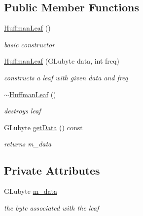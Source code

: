\subsection*{Public Member Functions}
\begin{DoxyCompactItemize}
\item 
\mbox{\label{classnta_1_1HuffmanLeaf_afcd113b293d90d3297d409421bbfb285}} 
\hyperlink{classnta_1_1HuffmanLeaf_afcd113b293d90d3297d409421bbfb285}{Huffman\+Leaf} ()
\begin{DoxyCompactList}\small\item\em basic constructor \end{DoxyCompactList}\item 
\mbox{\label{classnta_1_1HuffmanLeaf_a68e98537fe635d83cc04a2ce70e99993}} 
\hyperlink{classnta_1_1HuffmanLeaf_a68e98537fe635d83cc04a2ce70e99993}{Huffman\+Leaf} (G\+Lubyte data, int freq)
\begin{DoxyCompactList}\small\item\em constructs a leaf with given data and freq \end{DoxyCompactList}\item 
\mbox{\label{classnta_1_1HuffmanLeaf_a579b5b814ae18f2230a07c186f96890f}} 
\hyperlink{classnta_1_1HuffmanLeaf_a579b5b814ae18f2230a07c186f96890f}{$\sim$\+Huffman\+Leaf} ()
\begin{DoxyCompactList}\small\item\em destroys leaf \end{DoxyCompactList}\item 
\mbox{\label{classnta_1_1HuffmanLeaf_aebdea9a65041b1bca7dc89a32a44d0f3}} 
G\+Lubyte \hyperlink{classnta_1_1HuffmanLeaf_aebdea9a65041b1bca7dc89a32a44d0f3}{get\+Data} () const
\begin{DoxyCompactList}\small\item\em returns m\+\_\+data \end{DoxyCompactList}\end{DoxyCompactItemize}
\subsection*{Private Attributes}
\begin{DoxyCompactItemize}
\item 
\mbox{\label{classnta_1_1HuffmanLeaf_a1a02d12c1ee80e4d3686fb05a0d140b0}} 
G\+Lubyte \hyperlink{classnta_1_1HuffmanLeaf_a1a02d12c1ee80e4d3686fb05a0d140b0}{m\+\_\+data}
\begin{DoxyCompactList}\small\item\em the byte associated with the leaf \end{DoxyCompactList}\end{DoxyCompactItemize}
